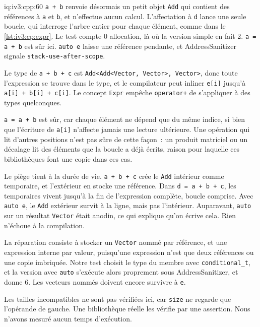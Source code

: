 \begin{solution}{iq:iv3:cpp:60}
\texttt{a + b} renvoie désormais un petit objet \texttt{Add} qui contient des références à \texttt{a} et \texttt{b}, et n'effectue aucun calcul. L'affectation à \texttt{d} lance une seule boucle, qui interroge l'arbre entier pour chaque élément, comme dans le \cref{lst:iv3:cp:expr}. Le test compte 0 allocation, là où la version simple en fait 2. \texttt{a = a + b} est sûr ici. \texttt{auto e} laisse une référence pendante, et AddressSanitizer signale \texttt{stack-use-after-scope}.
\label{lst:iv3:cp:expr}

Le type de \texttt{a + b + c} est \texttt{Add<Add<Vector, Vector>, Vector>}, donc toute l'expression se trouve dans le type, et le compilateur peut inliner \texttt{e[i]} jusqu'à \texttt{a[i] + b[i] + c[i]}. Le concept \texttt{Expr} empêche \texttt{operator+} de s'appliquer à des types quelconques.

\texttt{a = a + b} est sûr, car chaque élément ne dépend que du même indice, si bien que l'écriture de \texttt{a[i]} n'affecte jamais une lecture ultérieure. Une opération qui lit d'autres positions n'est pas sûre de cette façon~: un produit matriciel ou un décalage lit des éléments que la boucle a déjà écrits, raison pour laquelle ces bibliothèques font une copie dans ces cas.

Le piège tient à la durée de vie. \texttt{a + b + c} crée le \texttt{Add} intérieur comme temporaire, et l'extérieur en stocke une référence. Dans \texttt{d = a + b + c}, les temporaires vivent jusqu'à la fin de l'expression complète, boucle comprise. Avec \texttt{auto e}, le \texttt{Add} extérieur survit à la ligne, mais pas l'intérieur. Auparavant, \texttt{auto} sur un résultat \texttt{Vector} était anodin, ce qui explique qu'on écrive cela. Rien n'échoue à la compilation.

La réparation consiste à stocker un \texttt{Vector} nommé par référence, et une expression interne par valeur, puisqu'une expression n'est que deux références ou une copie imbriquée. Notre test choisit le type du membre avec \texttt{conditional\_t}, et la version avec \texttt{auto} s'exécute alors proprement sous AddressSanitizer, et donne 6. Les vecteurs nommés doivent encore survivre à \texttt{e}.

Les tailles incompatibles ne sont pas vérifiées ici, car \texttt{size} ne regarde que l'opérande de gauche. Une bibliothèque réelle les vérifie par une assertion. Nous n'avons mesuré aucun temps d'exécution.

\end{solution}
